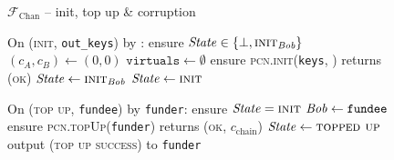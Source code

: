 
\begin{figure}[H]
  \begin{systembox}{$\mathcal{F}_{\mathrm{Chan}}$ -- init, top up \& corruption}
    \begin{algorithmic}[1]
      \State On (\textsc{init}, \texttt{out\_keys}) by \alice:
      \label{code:functionality:chan:skeleton:init:init:start}
      \Indent
        \State ensure $\mathit{State} \in \{\bot, \textsc{init}_{\mathit{Bob}}\}$
        \State $(c_A, c_B) \gets (0, 0)$
        \State $\texttt{virtuals} \gets \emptyset$
        \State ensure \textsc{pcn.init}(\texttt{keys}, \alice) returns
        (\textsc{ok})
          \State $\mathit{State} \gets \textsc{init}_{\mathit{Bob}}$
        \Else \: 
          \State $\mathit{State} \gets \textsc{init}$
        \EndIf
        \label{code:functionality:chan:skeleton:init:init:end}
      \EndIndent
      \Statex

      \State On (\textsc{top up}, \texttt{fundee}) by \texttt{funder}:
      \label{code:functionality:chan:skeleton:init:top_up:start}
      \Indent
        \State ensure $\mathit{State} = \textsc{init}$
        \State $\mathit{Bob} \gets \texttt{fundee}$
        \State ensure \textsc{pcn.topUp}(\texttt{funder}) returns (\textsc{ok},
        $c_{\mathrm{chain}}$)
        \State $\mathit{State} \gets \textsc{topped up}$
        \State output (\textsc{top up success}) to \texttt{funder}
        \label{code:functionality:chan:skeleton:init:top_up:end}
      \EndIndent
      \Statex


\end{algorithmic}
\end{systembox}
\end{figure}
